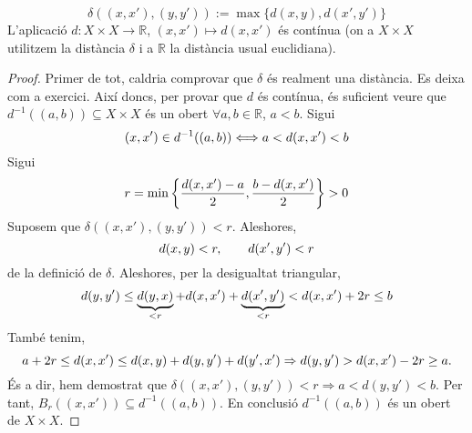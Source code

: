 \documentclass[../main.tex]{subfiles}
\begin{document}
\begin{ej}
\begin{enumerate}[(1)]
\begin{equation}
        \delta((x,x'),(y,y')):=\max\{d(x,y),d(x',y')\}
    \end{equation}
    L'aplicació $d:X\times X\rightarrow \mathbb{R}$, $(x,x')\mapsto d(x,x')$ és contínua (on a $X\times X$ utilitzem la distància $\delta$ i a $\mathbb{R}$ la distància usual euclidiana).
    \begin{proof}
    Primer de tot, caldria comprovar que $\delta$ és realment una distància. Es deixa com a exercici. Així doncs, per provar que $d$ és contínua, és suficient veure que $d^{-1}((a,b))\subseteq X\times X$ és un obert $\forall a,b\in \mathbb{R}$, $a<b$. Sigui
    \begin{equation}
        \notag
        (x,x')\in d^{-1}((a,b))\Longleftrightarrow a<d(x,x')<b
    \end{equation}
    Sigui
    \begin{equation}
        \notag
        r = \min\left\{\frac{d(x,x')-a}{2},\frac{b-d(x,x')}{2}\right\}>0
    \end{equation}
    Suposem que $\delta((x,x'),(y,y'))<r$. Aleshores,
    \begin{equation}
        \notag
        d(x,y)<r,\qquad d(x',y')<r
    \end{equation}
    de la definició de $\delta$. Aleshores, per la desigualtat triangular,
    \begin{equation}
        \notag
        d(y,y')\leq \underbrace{d(y,x)}_{<r}+d(x,x')+\underbrace{d(x',y')}_{<r}< d(x,x')+2r\leq b
    \end{equation}
    També tenim,
    \begin{equation}
        \notag
        a+2r\leq d(x,x')\leq d(x,y)+d(y,y')+d(y',x') \Rightarrow d(y,y')>d(x,x')-2r\geq a.
    \end{equation}
    És a dir, hem demostrat que $\delta((x,x'),(y,y'))<r\Rightarrow a<d(y,y')<b$. Per tant, $B_r((x,x'))\subseteq d^{-1}((a,b))$. En conclusió $d^{-1}((a,b))$ és un obert de $X\times X$.
    \end{proof}
\end{enumerate}
\end{ej}
\end{document}
